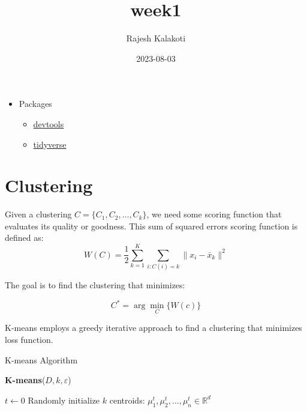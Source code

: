 \documentclass[
]{article}
\title{week1}
\author{Rajesh Kalakoti}
\date{2023-08-03}
\providecommand{\tightlist}{%
  \setlength{\itemsep}{0pt}\setlength{\parskip}{0pt}}
\begin{document}
\maketitle

\begin{itemize}
\tightlist
\item
  Packages

  \begin{itemize}
  \tightlist
  \item
    \href{https://www.r-project.org/nosvn/pandoc/devtools.html}{devtools}
  \item
    \href{https://www.tidyverse.org/packages/}{tidyverse}
  \end{itemize}
\end{itemize}

\hypertarget{clustering}{%
\section{Clustering}\label{clustering}}

Given a clustering \(C = \{C_1, C_2, \ldots, C_k\}\), we need some
scoring function that evaluates its quality or goodness. This sum of
squared errors scoring function is defined as:
\[ W(C) = \frac{1}{2} \sum_{k=1}^{K} \sum_{i: C(i)=k} \|x_i - \bar{x}_k\|^2 \]

The goal is to find the clustering that minimizes:

\[ C^* = \arg \min_C \{ W(c) \} \]

K-means employs a greedy iterative approach to find a clustering that
minimizes loss function.

\begin{algorithm}
\LinesNumbered %
\caption{K-means Algorithm}

\textbf{K-means}($D, k, \varepsilon$) {
  
  $t \leftarrow 0$\;
  Randomly initialize $k$ centroids: $\mu_{1}^{t}, \mu_{2}^{t}, \ldots, \mu_{n}^{t} \in \mathbb{R}^d$\;
}
\end{algorithm}
\end{document}
